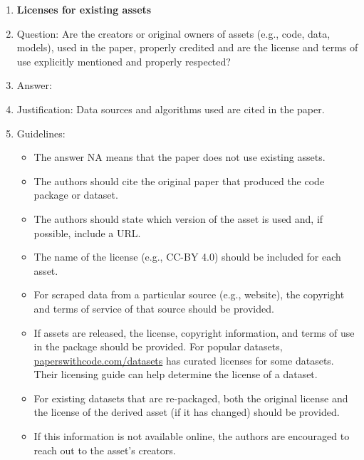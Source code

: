 \documentclass{article}
\theoremstyle{plain}
\theoremstyle{definition}
\theoremstyle{remark}
\begin{document}
\begin{enumerate}
\item {\bf Licenses for existing assets}
    \item[] Question: Are the creators or original owners of assets (e.g., code, data, models), used in the paper, properly credited and are the license and terms of use explicitly mentioned and properly respected?
    \item[] Answer: \answerYes{} %
    \item[] Justification: Data sources and algorithms used are cited in the paper.
    \item[] Guidelines:
    \begin{itemize}
        \item The answer NA means that the paper does not use existing assets.
        \item The authors should cite the original paper that produced the code package or dataset.
        \item The authors should state which version of the asset is used and, if possible, include a URL.
        \item The name of the license (e.g., CC-BY 4.0) should be included for each asset.
        \item For scraped data from a particular source (e.g., website), the copyright and terms of service of that source should be provided.
        \item If assets are released, the license, copyright information, and terms of use in the package should be provided. For popular datasets, \url{paperswithcode.com/datasets} has curated licenses for some datasets. Their licensing guide can help determine the license of a dataset.
        \item For existing datasets that are re-packaged, both the original license and the license of the derived asset (if it has changed) should be provided.
        \item If this information is not available online, the authors are encouraged to reach out to the asset's creators.
    \end{itemize}


\end{enumerate}
\end{document}
